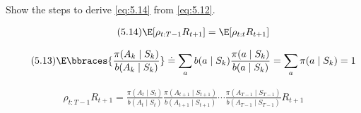 
\begin{exercise}

Show the steps to derive \eqref{eq:5.14} from \eqref{eq:5.12}.

\begin{align} \label{eq:5.14} \tag{5.14}
    \E[\rho_{t:T-1} R_{t+1}]
    =
    \E[\rho_{t:t} R_{t+1}]
\end{align}

\begin{align} \label{eq:5.13} \tag{5.13}
    \E
    \bbraces
    {
        \frac{\pi(A_k \mid S_k)}{b(A_k \mid S_k)}
    }
    \doteq
    \sum_a
        b(a \mid S_k)
        \frac{\pi(a \mid S_k)}{b(a \mid S_k)}
    =
    \sum_a
        \pi(a \mid S_k)
    =
    1
\end{align}

\begin{align} \label{eq:5.12} \tag{5.12}
  \rho_{t:T-1} R_{t+1}
  =
  \frac{\pi(A_t \mid S_t)}{b(A_t\mid S_t)}
  \frac{\pi(A_{t+1} \mid S_{t+1})}{b(A_{t+1}\mid S_{t+1})}
  \cdots
  \frac{\pi(A_{T-1} \mid S_{T-1})}{b(A_{T-1}\mid S_{T-1})}
  R_{t+1}
\end{align}
\end{exercise}


